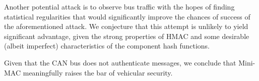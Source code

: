 Another potential attack is to observe bus traffic with the hopes of finding statistical
regularities that would significantly improve the chances of success of the aforementioned attack.
We conjecture that this attempt is unlikely to yield significant advantage, given the
strong properties of HMAC and some
desirable (albeit imperfect) characteristics of the component hash functions.

Given that the CAN bus does not authenticate messages, we conclude that Mini-MAC
meaningfully raises the bar of vehicular security.


	
